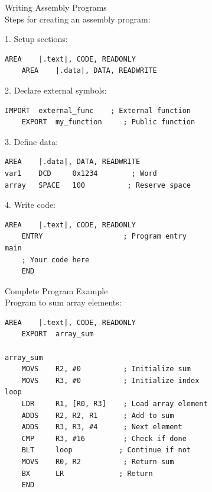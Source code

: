 \begin{KR}{Writing Assembly Programs}\\
Steps for creating an assembly program:

1. Setup sections:
\begin{lstlisting}[language=armasm, style=base]
    AREA    |.text|, CODE, READONLY
    AREA    |.data|, DATA, READWRITE
\end{lstlisting}

2. Declare external symbols:
\begin{lstlisting}[language=armasm, style=base]
    IMPORT  external_func    ; External function
    EXPORT  my_function     ; Public function
\end{lstlisting}

3. Define data:
\begin{lstlisting}[language=armasm, style=base]
    AREA    |.data|, DATA, READWRITE
var1    DCD     0x1234        ; Word
array   SPACE   100          ; Reserve space
\end{lstlisting}

4. Write code:
\begin{lstlisting}[language=armasm, style=base]
    AREA    |.text|, CODE, READONLY
    ENTRY                   ; Program entry
main
    ; Your code here
    END
\end{lstlisting}
\end{KR}

\begin{example2}{Complete Program Example}\\
Program to sum array elements:
\begin{lstlisting}[language=armasm, style=base]
    AREA    |.text|, CODE, READONLY
    EXPORT  array_sum
        
array_sum
    MOVS    R2, #0          ; Initialize sum
    MOVS    R3, #0          ; Initialize index
loop
    LDR     R1, [R0, R3]    ; Load array element
    ADDS    R2, R2, R1      ; Add to sum
    ADDS    R3, R3, #4      ; Next element
    CMP     R3, #16         ; Check if done
    BLT     loop           ; Continue if not
    MOVS    R0, R2          ; Return sum
    BX      LR             ; Return
    END
\end{lstlisting}
\end{example2}

